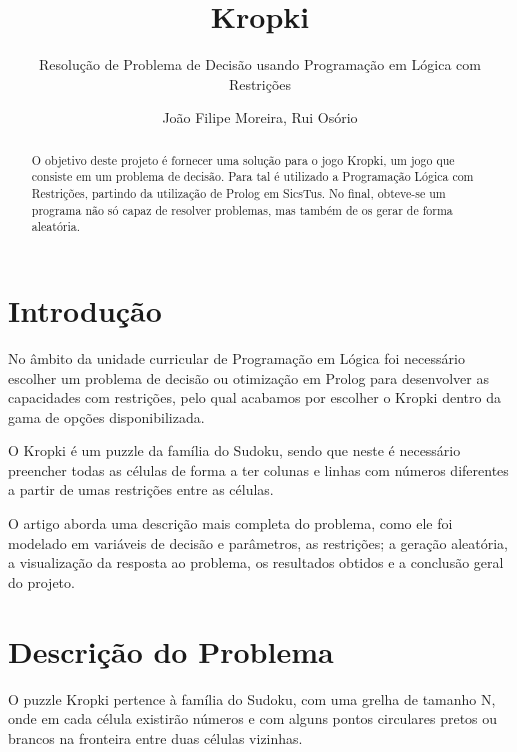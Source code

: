 \documentclass[runningheads,a4paper]{llncs}
\begin{document}
\mainmatter  %

\title{Kropki}
\subtitle{Resolução de Problema de Decisão usando
Programação em Lógica com Restrições}

\author{João Filipe Moreira, Rui Osório}


\maketitle

\begin{abstract}
O objetivo deste projeto é fornecer uma solução para o jogo Kropki, um jogo que consiste em um problema de decisão. Para tal é utilizado a Programação Lógica com Restrições, partindo da utilização de Prolog em SicsTus. No final, obteve-se um programa não só capaz de resolver problemas, mas também de os gerar de forma aleatória.
\end{abstract}


\section{Introdução}

No âmbito da unidade curricular de Programação em Lógica foi necessário escolher um problema de decisão ou otimização em Prolog para desenvolver as capacidades com restrições, pelo qual acabamos por escolher o Kropki dentro da gama de opções disponibilizada.

O Kropki é um puzzle da família do Sudoku, sendo que neste é necessário preencher todas as células de forma a ter colunas e linhas com números diferentes a partir de umas restrições entre as células.

O artigo aborda uma descrição mais completa do problema, como ele foi modelado em variáveis de decisão e parâmetros, as restrições; a geração aleatória, a visualização da resposta ao problema, os resultados obtidos e a conclusão geral do projeto.

\section{Descrição do Problema}

O puzzle Kropki pertence à família do Sudoku, com uma grelha de tamanho N, onde em cada célula existirão números e com alguns pontos circulares pretos ou brancos na fronteira entre duas células vizinhas.
\end{document}
